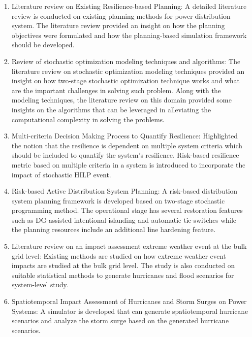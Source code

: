 \begin{enumerate}
    \item Literature review on Existing Resilience-based Planning: A detailed literature review is conducted on existing planning methods for power distribution system. The literature review provided an insight on how the planning objectives were formulated and how the planning-based simulation framework should be developed.  
    
    \item Review of stochastic optimization modeling techniques and algorithms: The literature review on stochastic optimization modeling techniques provided an insight on how two-stage stochastic optimization technique works and what are the important challenges in solving such problem. Along with the modeling techniques, the literature review on this domain provided some insights on the algorithms that can be leveraged in alleviating the computational complexity in solving the problems.  
    
    \item Multi-criteria Decision Making Process to Quantify Resilience: Highlighted the notion that the resilience is dependent on multiple system criteria which should be included to quantify the system's resilience. Risk-based resilience metric based on multiple criteria in a system is introduced to incorporate the impact of stochastic HILP event. 
    
    \item Risk-based Active Distribution System Planning: A risk-based distribution system planning framework is developed based on two-stage stochastic programming method. The operational stage has several restoration features such as DG-assisted intentional islanding and automatic tie-switches while the planning resources include an additional line hardening feature.  
    
    \item Literature review on an impact assessment extreme weather event at the bulk grid level: Existing methods are studied on how extreme weather event impacts are studied at the bulk grid level. The study is also conducted on suitable statistical methods to generate hurricanes and flood scenarios for system-level study. 
    
    \item Spatiotemporal Impact Assessment of Hurricanes and Storm Surges on Power Systems: A simulator is developed that can generate spatiotemporal hurricane scenarios and analyze the storm surge based on the generated hurricane scenarios.   
    
\end{enumerate}
